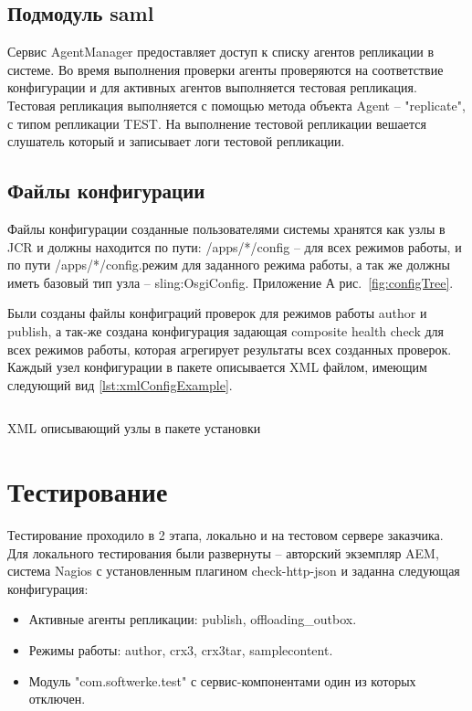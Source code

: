 \subsection{Подмодуль saml} 
Сервис AgentManager предоставляет доступ к списку агентов репликации в системе. Во время выполнения проверки агенты проверяются на соответствие конфигурации и для активных агентов выполняется тестовая репликация. Тестовая репликация выполняется с помощью метода объекта Agent – "replicate", с типом репликации TEST. На выполнение тестовой репликации вешается слушатель который и записывает логи тестовой репликации.

\subsection{Файлы конфигурации}
Файлы конфигурации созданные пользователями системы хранятся как узлы в JCR и должны находится по пути: /apps/*/config – для всех режимов работы, и по пути /apps/*/config.{режим} для заданного режима работы, а так же должны иметь базовый тип узла – sling:OsgiConfig. Приложение А рис.~\ref{fig:configTree}.

Были созданы файлы конфиграций проверок для режимов работы author и publish, а так-же создана конфигурация задающая composite health check для всех режимов работы, которая агрегирует результаты всех созданных проверок. Каждый узел конфигурации в пакете описывается XML файлом, имеющим следующий вид \ref{lst:xmlConfigExample}.

\begin{listing}[H]
\inputminted[linenos,frame=single]{xml}{inc/src/xmlConfigExample}
\caption{XML описывающий узлы в пакете установки} 
\label{lst:xmlConfigExample}
\end{listing}

\section{Тестирование}

Тестирование проходило в 2 этапа, локально и на тестовом сервере заказчика.
Для локального тестирования были развернуты – авторский экземпляр AEM, система Nagios \cite{web:nagiosInstall} с установленным плагином check-http-json и заданна следующая конфигурация:
\begin{itemize}
\item Активные агенты репликации: publish, offloading\_outbox.
\item Режимы работы: author, crx3, crx3tar, samplecontent.
\item Модуль "com.softwerke.test" с сервис-компонентами один из которых отключен.
\end{itemize}

